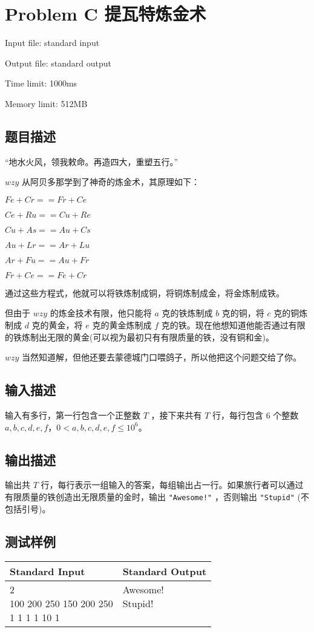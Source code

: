 \newpage
\section{Problem C 提瓦特炼金术}
{ \limitfont{}
Input file: standard input \par
Output file: standard output \par
Time limit: 1000ms \par
Memory limit: 512MB \par
}
\subsection*{题目描述}

{\kaishu “地水火风，领我敕命。再造四大，重塑五行。”}

$wzy$ 从阿贝多那学到了神奇的炼金术，其原理如下：

$Fe + Cr == Fr +Ce$

$Ce + Ru == Cu +Re$

$Cu + As = = Au + Cs$

$Au+Lr==Ar+Lu$

$Ar+Fu==Au+Fr$

$Fr+Ce==Fe+Cr$

通过这些方程式，他就可以将铁炼制成铜，将铜炼制成金，将金炼制成铁。

但由于 $wzy$ 的炼金技术有限，他只能将 $a$ 克的铁炼制成 $b$ 克的铜，将 $c$ 克的铜炼制成 $d$ 克的黄金，将 $e$ 克的黄金炼制成 $f$ 克的铁。现在他想知道他能否通过有限的铁炼制出无限的黄金(可以视为最初只有有限质量的铁，没有铜和金)。

$wzy$ 当然知道解，但他还要去蒙德城门口喂鸽子，所以他把这个问题交给了你。

\subsection*{输入描述}

输入有多行，第一行包含一个正整数 $T$ ，接下来共有 $T$ 行，每行包含 $6$ 个整数 $a,b,c,d,e,f$，$0<a,b,c,d,e,f\le10^6$。

\subsection*{输出描述}

输出共 $T$ 行，每行表示一组输入的答案，每组输出占一行。如果旅行者可以通过有限质量的铁创造出无限质量的金时，输出 \lstinline|"Awesome!"| ，否则输出 \lstinline|"Stupid"| (不包括引号)。

\subsection*{测试样例}

\begin{table}[H]
\begin{tabularx}{\textwidth}{|X|X|}
    \hline
    \textbf{Standard Input} & \textbf{Standard Output} \\ 
    \hline
    \tablecell{2\\ 100 200 250 150 200 250\\ 1 1 1 1 10 1 \\} & 
    \tablecell{Awesome!\\ Stupid! \\ \\} \\ 
    \hline
\end{tabularx}
\end{table}